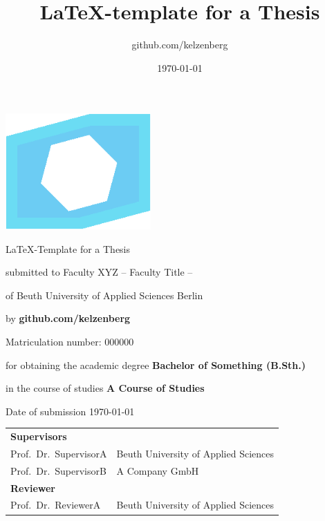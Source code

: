 \begin{titlepage}
  \title{\LaTeX-template for a Thesis}
  \author{github.com/kelzenberg}
  \date{\today}

  \begin{center}

    \includegraphics[width=15em]{images/Logo.eps}

    \vfill

    \huge \LaTeX-Template for a Thesis

    \vfill

    

    \normalsize submitted to Faculty XYZ – Faculty Title –

    of Beuth University of Applied Sciences Berlin

    \vspace{1em}

    by \textbf{github.com/kelzenberg}

    Matriculation number: 000000

    \vspace{1em}

    \normalsize for obtaining the academic degree \textbf{Bachelor of Something (B.Sth.)}
    
    in the course of studies \textbf{A Course of Studies}

    \vfill

    \normalsize Date of submission \today

  \end{center}

  \vfill

  \noindent\begin{tabular}{ll}
    \multicolumn{2}{l}{\textbf{Supervisors}}                       \\
    Prof.~Dr.~SupervisorA         & Beuth University of Applied Sciences \\
    Prof.~Dr.~SupervisorB         & A Company GmbH                   \\[1em]
    \multicolumn{2}{l}{\textbf{Reviewer}}                          \\
    Prof.~Dr.~ReviewerA           & Beuth University of Applied Sciences
  \end{tabular}

\end{titlepage}

\cleardoublepage